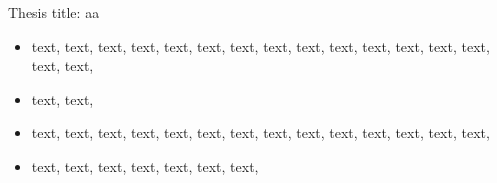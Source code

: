 \documentclass[10pt,a4paper,ragged2e]{altacv}
\begin{document}

\begin{fullwidth}
\makecvheader
\end{fullwidth}



\cvevent{}{}{}{}

Thesis title: aa

\divider



\begin{itemize}
\item text, text, text, text, text, text, text, text, text, text, text, text, text, text, text, text, 
\item text, text, 
\end{itemize}
\divider

\begin{itemize}
\item text, text, text, text, text, text, text, text, text, text, text, text, text, text, 
\item text, text, text, text, text, text, text, 
\end{itemize}
\divider
\end{document}
